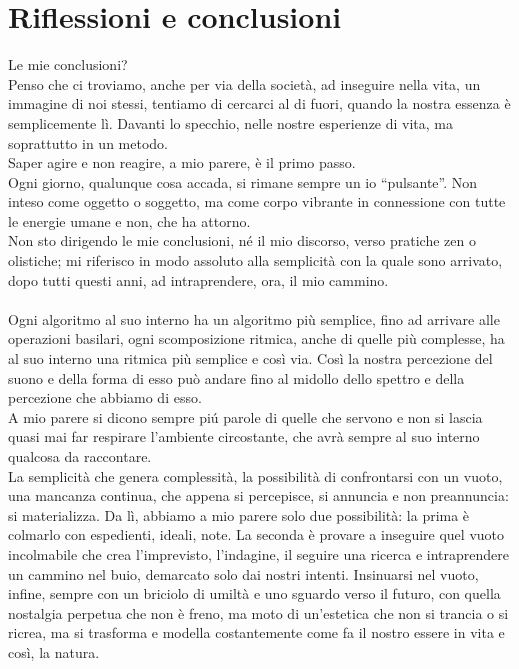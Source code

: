
\chapter{Riflessioni e conclusioni}
\label{chp:Riflessioni e conclusioni}

Le mie conclusioni? \\
Penso che ci troviamo, anche per via della società, ad inseguire nella vita, un immagine di noi stessi, tentiamo di cercarci al di fuori, quando la nostra essenza è semplicemente lì. Davanti lo specchio, nelle nostre esperienze di vita, ma soprattutto in un metodo. \\
Saper agire e non reagire, a mio parere, è il primo passo. \\
Ogni giorno, qualunque cosa accada, si rimane sempre un io “pulsante”. Non inteso come oggetto o soggetto, ma come corpo vibrante in connessione con tutte le energie umane e non, che ha attorno. \\
Non sto dirigendo le mie conclusioni, né il mio discorso, verso pratiche zen o olistiche; mi riferisco in modo assoluto alla semplicità con la quale sono arrivato, dopo tutti questi anni, ad intraprendere, ora, il mio cammino. 
\\ \\
Ogni algoritmo al suo interno ha un algoritmo più semplice, fino ad arrivare alle operazioni basilari, ogni scomposizione ritmica, anche di quelle più complesse, ha al suo interno una ritmica più semplice e così via. Così la nostra percezione del suono e della forma di esso può andare fino al midollo dello spettro e della percezione che abbiamo di esso. \\
A mio parere si dicono sempre pi\'u parole di quelle che servono e non si lascia quasi mai far respirare l'ambiente circostante, che avrà sempre al suo interno qualcosa da raccontare. \\
La semplicità che genera complessità, la possibilità di confrontarsi con un vuoto, una mancanza continua, che appena si percepisce, si annuncia e non preannuncia: si materializza. Da lì, abbiamo a mio parere solo due possibilità: la prima è colmarlo con espedienti, ideali, note. La seconda è provare a inseguire quel vuoto incolmabile che crea l’imprevisto, l’indagine, il seguire una ricerca e intraprendere un cammino nel buio, demarcato solo dai nostri intenti. Insinuarsi nel vuoto, infine, sempre con un briciolo di umiltà e uno sguardo verso il futuro, con quella nostalgia perpetua che non è freno, ma moto di un’estetica che non si trancia o si ricrea, ma si trasforma e modella costantemente come fa il nostro essere in vita e così, la natura.